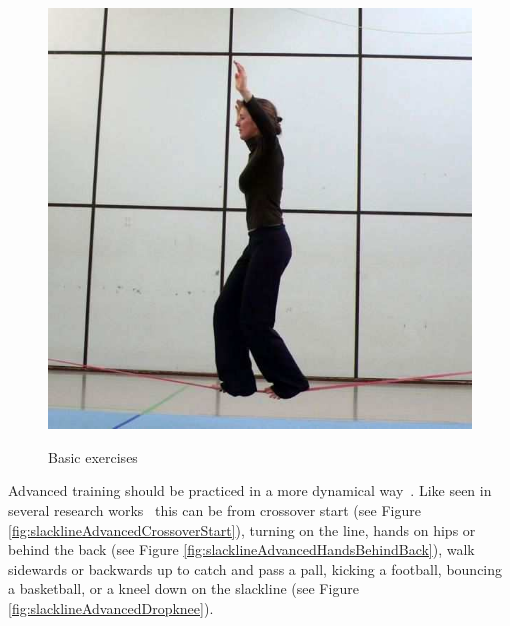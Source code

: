 \begin{figure}[htb]
\begin{minipage}[t]{0.33\linewidth}
		\includegraphics[width=1\linewidth]{Pictures/slacklineBasicBothFeet}
		\label{fig:slacklineBasicBothFeet}
	\end{minipage}
	\caption{Basic exercises~\cite{Kroiss2007-ab}}
	\label{fig:basicExercises}
\end{figure}

Advanced training should be practiced in a more dynamical way~\cite{Thomann2013-aa}. Like seen in several research works~\cite{Donath2013-kk, Donath2016-gm, Granacher2010-ow, Keller2012-xh, Pfusterschmied2013-yy} this can be from crossover start (see Figure \ref{fig:slacklineAdvancedCrossoverStart}), turning on the line, hands on hips or behind the back (see Figure \ref{fig:slacklineAdvancedHandsBehindBack}), walk sidewards or backwards up to catch and pass a pall, kicking a football, bouncing a basketball, or a kneel down on the slackline (see Figure \ref{fig:slacklineAdvancedDropknee}).

